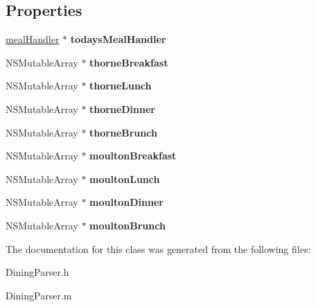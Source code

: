 \subsection*{Properties}
\begin{DoxyCompactItemize}
\item 
\hypertarget{interface_dining_parser_af1a8cd17148e581e680ff45f690f8126}{
\hyperlink{interfacemeal_handler}{mealHandler} $\ast$ {\bfseries todaysMealHandler}}
\label{interface_dining_parser_af1a8cd17148e581e680ff45f690f8126}

\item 
\hypertarget{interface_dining_parser_a08db52b5ebb1d6f2721bffa01ca7e7de}{
NSMutableArray $\ast$ {\bfseries thorneBreakfast}}
\label{interface_dining_parser_a08db52b5ebb1d6f2721bffa01ca7e7de}

\item 
\hypertarget{interface_dining_parser_a40ded97a595628f9757f4670a531f084}{
NSMutableArray $\ast$ {\bfseries thorneLunch}}
\label{interface_dining_parser_a40ded97a595628f9757f4670a531f084}

\item 
\hypertarget{interface_dining_parser_ab61efd5365908e83a1f4e0e14cfd04c6}{
NSMutableArray $\ast$ {\bfseries thorneDinner}}
\label{interface_dining_parser_ab61efd5365908e83a1f4e0e14cfd04c6}

\item 
\hypertarget{interface_dining_parser_a4dee5b072798cddb4ad528916eb6b9aa}{
NSMutableArray $\ast$ {\bfseries thorneBrunch}}
\label{interface_dining_parser_a4dee5b072798cddb4ad528916eb6b9aa}

\item 
\hypertarget{interface_dining_parser_a757ef961a3bc36567970eab989c09f6b}{
NSMutableArray $\ast$ {\bfseries moultonBreakfast}}
\label{interface_dining_parser_a757ef961a3bc36567970eab989c09f6b}

\item 
\hypertarget{interface_dining_parser_aa35071c55a1ff573e5dc083ba0aecb48}{
NSMutableArray $\ast$ {\bfseries moultonLunch}}
\label{interface_dining_parser_aa35071c55a1ff573e5dc083ba0aecb48}

\item 
\hypertarget{interface_dining_parser_a956d2d7ef2a1591843e3fe958af4cefa}{
NSMutableArray $\ast$ {\bfseries moultonDinner}}
\label{interface_dining_parser_a956d2d7ef2a1591843e3fe958af4cefa}

\item 
\hypertarget{interface_dining_parser_ac528f0f392bbeeca3be016a5bf426938}{
NSMutableArray $\ast$ {\bfseries moultonBrunch}}
\label{interface_dining_parser_ac528f0f392bbeeca3be016a5bf426938}

\end{DoxyCompactItemize}


The documentation for this class was generated from the following files:\begin{DoxyCompactItemize}
\item 
DiningParser.h\item 
DiningParser.m\end{DoxyCompactItemize}

